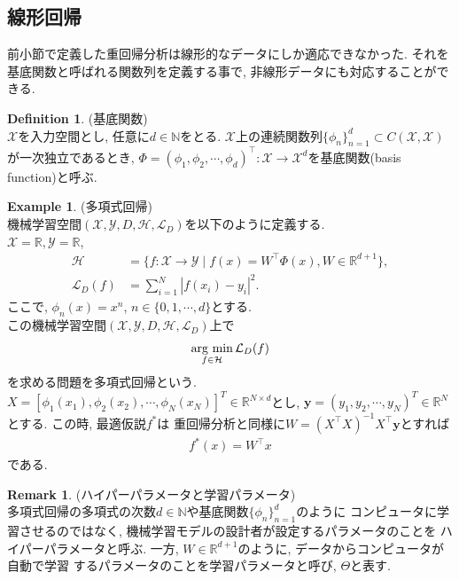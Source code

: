 \documentclass[11pt, a4paper, dvipdfmx]{jsarticle}
\theoremstyle{definition}
\newtheorem{Definition+}[Axiom+]{Definition}
\newtheorem{Example+}[Axiom+]{Example}
\newtheorem{Remark+}[Axiom+]{Remark}
\newcommand{\N}{\mathbb{N}}
\newcommand{\R}{\mathbb{R}}
\newcommand{\X}{\mathcal{X}}
\newcommand{\Y}{\mathcal{Y}}
\newcommand{\Hil}{\mathcal{H}}
\newcommand{\Loss}{\mathcal{L}_{D}}
\newcommand{\MLsp}{(\X, \Y, D, \Hil, \Loss)}
\newcommand{\argmin}{\mathop{\rm arg~min}\limits}
\begin{document}
\subsection{線形回帰}
前小節で定義した重回帰分析は線形的なデータにしか適応できなかった. それを
基底関数と呼ばれる関数列を定義する事で, 非線形データにも対応することができる.
\begin{Definition+}(基底関数)\\
    $\X$を入力空間とし, 任意に$d\in\N$をとる. $\X$上の連続関数列$\{\phi_{n}\}_{n = 1}^{d}\subset C(\X, \X)$
    が一次独立であるとき, $\Phi = (\phi_1, \phi_2, \cdots, \phi_d)^{\top}:\X\to\X^{d}$を基底関数(basis function)と呼ぶ.
\end{Definition+}
\begin{Example+}(多項式回帰)\\
    機械学習空間$\MLsp$を以下のように定義する.\\
    $\X = \R, \Y = \R$, 
    \begin{align*}
        \Hil &= \{f:\X\to\Y\mid f(x) = W^{\top}\Phi(x), W\in\R^{d + 1}\},\\
        \Loss(f) &= \sum_{i = 1}^{N}|f(x_i) - y_i|^2.
    \end{align*}
    ここで, $\phi_{n}(x) = x^{n}$, $n\in\{0, 1, \cdots, d\}$とする.\\
    この機械学習空間$\MLsp$上で
    \begin{align*}
        \argmin_{f\in\Hil}\Loss(f)
    \end{align*}
    を求める問題を多項式回帰という. $X = [\phi_{1}(x_1), \phi_{2}(x_{2}), \cdots, \phi_{N}(x_N)]^{T}\in\R^{N\times d}$とし, 
    $\mathbf{y} = (y_{1}, y_{2}, \cdots, y_{N})^{T}\in\R^{N}$とする. この時, 最適仮説$f^{*}$は
    重回帰分析と同様に$W = (X^\top X)^{-1}X^\top\mathbf{y}$とすれば
    \begin{align*}
        f^{*}(x) = W^{\top}x
    \end{align*}
    である. 
\end{Example+}
\begin{Remark+}(ハイパーパラメータと学習パラメータ)\\
    多項式回帰の多項式の次数$d\in\N$や基底関数$\{\phi_{n}\}_{n = 1}^{d}$のように
    コンピュータに学習させるのではなく, 機械学習モデルの設計者が設定するパラメータのことを
    ハイパーパラメータと呼ぶ. 一方, $W\in\R^{d + 1}$のように, データからコンピュータが自動で学習
    するパラメータのことを学習パラメータと呼び, $\Theta$と表す.
\end{Remark+}
\end{document}
